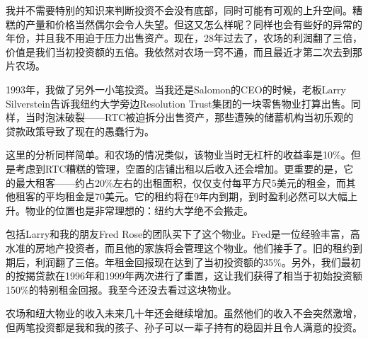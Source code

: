 \documentclass[UTF8,a4paper,zihao=-4,fontset = windows]{ctexart} %
\begin{document}
我并不需要特别的知识来判断投资不会没有底部，同时可能有可观的上升空间。糟糕的产量和价格当然偶尔会令人失望。但这又怎么样呢？同样也会有些好的异常的年份，并且我不用迫于压力出售资产。现在，28年过去了，农场的利润翻了三倍，价值是我们当初投资额的五倍。我依然对农场一窍不通，而且最近才第二次去到那片农场。

1993年，我做了另外一小笔投资。当我还是Salomon的CEO的时候，老板Larry Silverstein告诉我纽约大学旁边Resolution Trust集团的一块零售物业打算出售。同样，当时泡沫破裂——RTC被迫拆分出售资产，那些遭殃的储蓄机构当初乐观的贷款政策导致了现在的愚蠢行为。

这里的分析同样简单。和农场的情况类似，该物业当时无杠杆的收益率是10\%。但是考虑到RTC糟糕的管理，空置的店铺出租以后收入还会增加。更重要的是，它的最大租客——约占20\%左右的出租面积，仅仅支付每平方尺5美元的租金，而其他租客的平均租金是70美元。它的租约将在9年内到期，到时盈利必然可以大幅上升。物业的位置也是非常理想的：纽约大学绝不会搬走。

包括Larry和我的朋友Fred Rose的团队买下了这个物业。Fred是一位经验丰富，高水准的房地产投资者，而且他的家族将会管理这个物业。他们接手了。旧的租约到期后，利润翻了三倍。年租金回报现在达到了当初投资额的35\%。另外，我们最初的按揭贷款在1996年和1999年两次进行了重置，这让我们获得了相当于初始投资额150\%的特别租金回报。我至今还没去看过这块物业。

农场和纽大物业的收入未来几十年还会继续增加。虽然他们的收入不会突然激增，但两笔投资都是我和我的孩子、孙子可以一辈子持有的稳固并且令人满意的投资。
\end{document}
